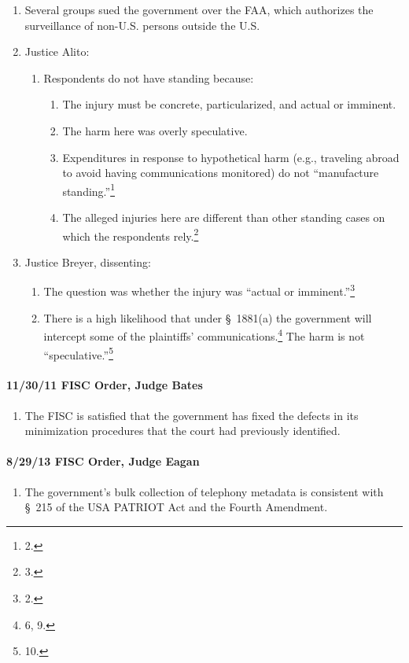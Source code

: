\begin{enumerate}
    \item Several groups sued the government over the FAA, which authorizes 
    the surveillance of non-U.S. persons outside the U.S.
    \item Justice Alito:
    \begin{enumerate}
        \item Respondents do not have standing because:
        \begin{enumerate}
            \item The injury must be concrete, particularized, and actual or 
            imminent.
            \item The harm here was overly speculative.
            \item Expenditures in response to hypothetical harm (e.g., 
            traveling abroad to avoid having communications monitored) do not 
            ``manufacture standing.''\footnote{2.}
            \item The alleged injuries here are different than other standing 
            cases on which the respondents rely.\footnote{3.}
        \end{enumerate}
    \end{enumerate}
    \item Justice Breyer, dissenting:
    \begin{enumerate}
        \item The question was whether the injury was ``actual or 
        imminent.''\footnote{2.}
        \item There is a high likelihood that under \S\ 1881(a) the government 
        will intercept some of the plaintiffs' communications.\footnote{6, 9.} 
        The harm is not ``speculative.''\footnote{10.}
    \end{enumerate}
\end{enumerate}

\paragraph{11/30/11 FISC Order, Judge Bates}

\begin{enumerate}
    \item The FISC is satisfied that the government has fixed the defects in 
    its minimization procedures that the court had previously identified.
\end{enumerate}

\paragraph{8/29/13 FISC Order, Judge Eagan}

\begin{enumerate}
    \item The government's bulk collection of telephony metadata is consistent 
    with \S\ 215 of the USA PATRIOT Act and the Fourth Amendment.
\end{enumerate}
